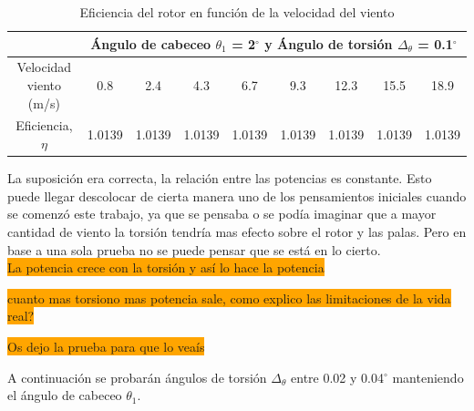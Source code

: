 \begin{table}[H]
\centering
\begin{tabular}{c|cccccccc|}
\cline{2-9}
\multicolumn{1}{l|}{} &
  \multicolumn{8}{c|}{Ángulo de cabeceo $\theta_1$ = 2$^{\circ}$ y Ángulo de torsión $\Delta_\theta$ = 0.1$^{\circ}$} \\ \hline
\multicolumn{1}{|c|}{Velocidad viento (m/s)} &
  \multicolumn{1}{c|}{0.8} &
  \multicolumn{1}{c|}{2.4} &
  \multicolumn{1}{c|}{4.3} &
  \multicolumn{1}{c|}{6.7} &
  \multicolumn{1}{c|}{9.3} &
  \multicolumn{1}{c|}{12.3} &
  \multicolumn{1}{c|}{15.5} &
  18.9 \\ \hline
\multicolumn{1}{|c|}{Eficiencia, $\eta$} &
  \multicolumn{1}{c|}{1.0139} &
  \multicolumn{1}{c|}{1.0139} &
  \multicolumn{1}{c|}{1.0139} &
  \multicolumn{1}{c|}{1.0139} &
  \multicolumn{1}{c|}{1.0139} &
  \multicolumn{1}{c|}{1.0139} &
  \multicolumn{1}{c|}{1.0139} &
  1.0139 \\ \hline
\end{tabular}
    \caption{Eficiencia del rotor en función de la velocidad del viento}
     \label{tabla:eficiencia_primer_intento}
\end{table}

La suposición era correcta, la relación entre las potencias es constante. Esto puede llegar descolocar de cierta manera uno de los pensamientos iniciales cuando se comenzó este trabajo, ya que se pensaba o se podía imaginar que a mayor cantidad de viento la torsión tendría mas efecto sobre el rotor y las palas. Pero en base a una sola prueba no se puede pensar que se está en lo cierto. \\

\colorbox{orange}{La potencia crece con la torsión y así lo hace la potencia}

\colorbox{orange}{cuanto mas torsiono mas potencia sale, como explico las limitaciones de la vida real?}

\colorbox{orange}{Os dejo la prueba para que lo veaís}

A continuación se probarán ángulos de torsión $\Delta_\theta$ entre 0.02 y 0.04$^{\circ}$  manteniendo el ángulo de cabeceo $\theta_1$.

